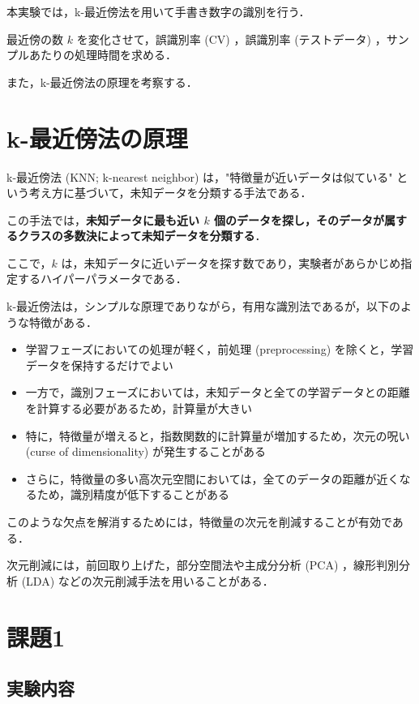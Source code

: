 \documentclass[fleqn, a4paper. 12pt]{jsarticle}
\begin{document}
    本実験では，k-最近傍法を用いて手書き数字の識別を行う．

    最近傍の数 $k$ を変化させて，誤識別率 (CV) ，誤識別率 (テストデータ) ，サンプルあたりの処理時間を求める．

    また，k-最近傍法の原理を考察する．

  \section{k-最近傍法の原理}

    k-最近傍法 (KNN; k-nearest neighbor) は，"特徴量が近いデータは似ている" という考え方に基づいて，未知データを分類する手法である．

    この手法では，\textbf{未知データに最も近い $k$ 個のデータを探し，そのデータが属するクラスの多数決によって未知データを分類する}．

    ここで，$k$ は，未知データに近いデータを探す数であり，実験者があらかじめ指定するハイパーパラメータである．

    k-最近傍法は，シンプルな原理でありながら，有用な識別法であるが，以下のような特徴がある．
    
    \begin{itemize}
      \item 学習フェーズにおいての処理が軽く，前処理 (preprocessing) を除くと，学習データを保持するだけでよい
      \item 一方で，識別フェーズにおいては，未知データと全ての学習データとの距離を計算する必要があるため，計算量が大きい
      \item 特に，特徴量が増えると，指数関数的に計算量が増加するため，次元の呪い (curse of dimensionality) が発生することがある
      \item さらに，特徴量の多い高次元空間においては，全てのデータの距離が近くなるため，識別精度が低下することがある
    \end{itemize}

    このような欠点を解消するためには，特徴量の次元を削減することが有効である．
    
    次元削減には，前回取り上げた，部分空間法や主成分分析 (PCA) ，線形判別分析 (LDA) などの次元削減手法を用いることがある．

  \section{課題1}

    \subsection{実験内容}
\end{document}
